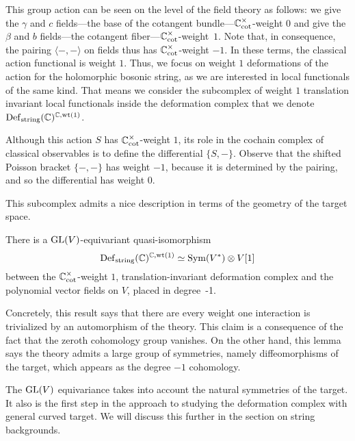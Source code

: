 This group action can be seen on the level of the field theory as follows: 
we give the $\gamma$ and $c$ fields---the base of the cotangent bundle---$\mathbb C_{\rm cot}^\times$-weight $0$ and give the $\beta$ and $b$ fields---the cotangent fiber---$\mathbb C_{\rm cot}^\times$-weight~$1$. 
Note that, in consequence, the pairing $\langle-,-\rangle$ on fields thus has $\mathbb C_{\rm cot}^\times$-weight $-1$.
In these terms, the classical action functional is weight $1$. 
Thus, we focus on weight $1$ deformations of the action for the holomorphic bosonic string,
as we are interested in local functionals of the same kind.
That means we consider the subcomplex of weight $1$ translation invariant local functionals inside the deformation complex that we denote ${\rm Def}_{\rm string}(\mathbb C)^{\mathbb C, {\rm wt}(1)}$.

\begin{rmk}\label{rmk: classical weights}
Although this action $S$ has $\mathbb C_{\rm cot}^\times$-weight $1$, 
its role in the cochain complex of classical observables is to define the differential $\{S,-\}$.
Observe that the shifted Poisson bracket $\{-,-\}$ has weight $-1$, 
because it is determined by the pairing, 
and so the differential has weight $0$. 
\end{rmk}

This subcomplex admits a nice description in terms of the geometry of the target space.


\begin{lem}
\label{lem: def complex wt zero} 
There is a ${\rm GL}(V)$-equivariant quasi-isomorphism
\[
{\rm Def}_{\rm string}(\mathbb C)^{\mathbb C, {\rm wt}(1)} \simeq {\rm Sym}(V^*) \otimes V[1]
\]
between the $\mathbb C_{\rm cot}^\times$-weight $1$, translation-invariant deformation complex 
and the polynomial vector fields on $V$, placed in degree~-1.
\end{lem}

Concretely, this result says that there are every weight one interaction is trivialized by an automorphism of the theory.
This claim is a consequence of the fact that the zeroth cohomology group vanishes.
On the other hand, this lemma says the theory admits a large group of symmetries,
namely diffeomorphisms of the target, 
which appears as the degree $-1$ cohomology.

The ${\rm GL}(V)$ equivariance takes into account the natural symmetries of the target. 
It also is the first step in the approach to studying the deformation complex with general curved target. 
We will discuss this further in the section on string backgrounds. 

